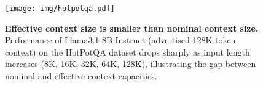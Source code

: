 \begin{figure}[t!]
    \begin{center}
    \texttt{[image: img/hotpotqa.pdf]}
    \end{center}
    \caption{\textbf{Effective context size is smaller than nominal context size.} 
    Performance of Llama3.1-8B-Instruct (advertised 128K-token context) on the HotPotQA dataset 
    drops sharply as input length increases (8K, 16K, 32K, 64K, 128K), illustrating the 
    gap between nominal and effective context capacities.}
    \label{fig:hotpotQA}
\end{figure}
